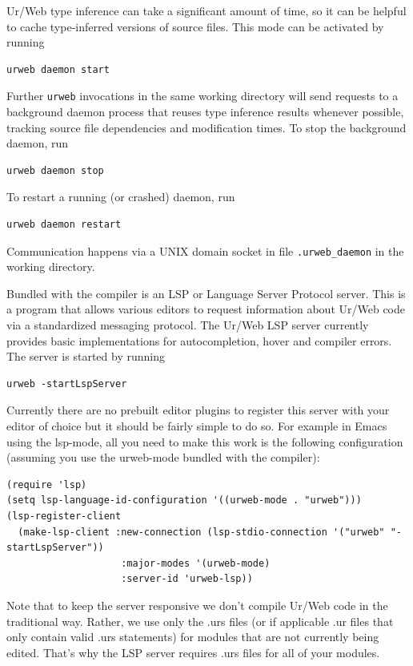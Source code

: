 \documentclass{article}
\newcommand{\cd}[1]{\texttt{#1}}
\begin{document}
Ur/Web type inference can take a significant amount of time, so it can be helpful to cache type-inferred versions of source files.  This mode can be activated by running
\begin{verbatim}
urweb daemon start
\end{verbatim}
Further \cd{urweb} invocations in the same working directory will send requests to a background daemon process that reuses type inference results whenever possible, tracking source file dependencies and modification times.  To stop the background daemon, run
\begin{verbatim}
urweb daemon stop
\end{verbatim}
To restart a running (or crashed) daemon, run
\begin{verbatim}
urweb daemon restart
\end{verbatim}
Communication happens via a UNIX domain socket in file \cd{.urweb\_daemon} in the working directory.

Bundled with the compiler is an LSP or Language Server Protocol server. This is a program that allows various editors to request information about Ur/Web code via a standardized messaging protocol. The Ur/Web LSP server currently provides basic implementations for autocompletion, hover and compiler errors. The server is started by running
\begin{verbatim}
urweb -startLspServer
\end{verbatim}
Currently there are no prebuilt editor plugins to register this server with your editor of choice but it should be fairly simple to do so. For example in Emacs using the lsp-mode, all you need to make this work is the following configuration (assuming you use the urweb-mode bundled with the compiler):
\begin{verbatim}
(require 'lsp)
(setq lsp-language-id-configuration '((urweb-mode . "urweb")))
(lsp-register-client
  (make-lsp-client :new-connection (lsp-stdio-connection '("urweb" "-startLspServer"))
                    :major-modes '(urweb-mode)
                    :server-id 'urweb-lsp))
\end{verbatim}
Note that to keep the server responsive we don't compile Ur/Web code in the traditional way. Rather, we use only the .urs files (or if applicable .ur files that only contain valid .urs statements) for modules that are not currently being edited. That's why the LSP server requires .urs files for all of your modules.

\medskip
\end{document}
